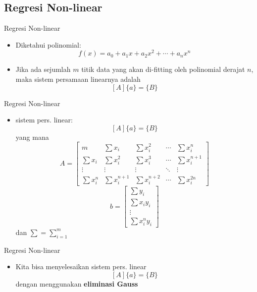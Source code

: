 \documentclass[pdflatex,compress,mathserif]{beamer}
\begin{document}
\subsection{Regresi Non-linear}

\begin{frame}{Regresi Non-linear}
	\begin{itemize}
		\item Diketahui polinomial:
		$$ f(x) = a_0 + a_1 x + a_2 x^2 + \cdots + a_n x^n $$
		\item Jika ada sejumlah $m$ titik data yang akan di-fitting oleh polinomial derajat $n$, maka sistem persamaan linearnya adalah
		$$ [A]\{a\} = \{B\} $$
	\end{itemize}
\end{frame}

\begin{frame}{Regresi Non-linear}
	\begin{itemize}
		\item sistem pers. linear: $$ [A]\{a\} = \{B\} $$
		yang mana
		$$ A = \begin{bmatrix}
			m & \sum x_i & \sum x_i^2 & \cdots & \sum x_i^n \\
			\sum x_i & \sum x_i^2 & \sum x_i^3 & \cdots & \sum x_i^{n+1} \\
			\vdots & \vdots & \vdots & \ddots & \vdots \\
			\sum x_i^n & \sum x_i^{n+1} & \sum x_i^{n+2} & \cdots & \sum x_i^{2n}
		\end{bmatrix} $$
		$$ b = \begin{bmatrix}
			\sum y_i \\ \sum x_i y_i \\ \vdots \\ \sum x_i^n y_i
		\end{bmatrix} $$ dan $ \sum = \sum_{i = 1}^{m}$
	\end{itemize}
\end{frame}

\begin{frame}{Regresi Non-linear}
	\begin{itemize}
		\item Kita bisa menyelesaikan sistem pers. linear $$ [A]\{a\} = \{B\} $$ dengan menggunakan \textbf{eliminasi Gauss}
	\end{itemize}
\end{frame}
\end{document}
